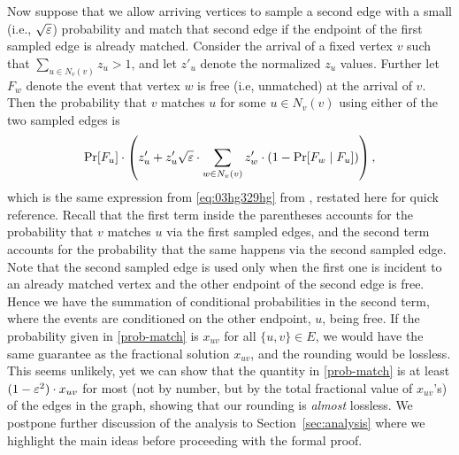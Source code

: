 Now suppose that we allow arriving vertices to sample a second edge with a small 
(i.e., $\sqrt{\varepsilon}$) probability and match that second edge if the endpoint of the first sampled 
edge is already matched.
Consider the arrival of a fixed vertex $v$ such that $\sum_{u \in N_v(v)}z_u > 1$, and let 
$z'_u$ denote the normalized $z_u$ values. Further let $F_w$ denote the event that vertex $w$ is free (i.e, unmatched) at the arrival of $v$. 
Then the probability that $v$ matches $u$ for some $u \in N_v(v)$ using either of the two sampled
edges is
\begin{align}
    \Pr[F_u] \cdot \left(z'_{u} + z'_u \sqrt{\varepsilon} \cdot 
    \sum_{w\in N_v(v)} z'_w \cdot (1-\Pr[F_w \mid F_u]) \right), \label{prob-match}
\end{align}
which is the same expression from \eqref{eq:03hg329hg} from , restated here for quick reference. 
Recall that the first term inside the parentheses accounts for the probability that $v$ matches 
$u$ via the first sampled edges, and the second term accounts for the probability that the same 
happens via the second sampled edge. 
Note that the second sampled edge is used only when the first one
is incident to an already matched vertex and the other endpoint of the second edge is free. 
Hence we have the summation of conditional probabilities in the second term, 
where the events are conditioned on the other endpoint, $u$, being free.
If the probability given in \eqref{prob-match} is $x_{uv}$ for all $\{u,v\} \in E$, we would have 
the same guarantee as the fractional solution  $x_{uv}$, and the rounding would be lossless. 
This seems unlikely, yet we can show that the quantity in \eqref{prob-match} is at least  
$(1 - \varepsilon^2) \cdot x_{uv}$ for most (not by number, but by the total fractional value of $x_{uv}$'s) of 
the edges in the graph, showing that our rounding is \emph{almost} lossless. 
We postpone further discussion of the analysis to Section~\ref{sec:analysis} where we highlight the main ideas 
before proceeding with the formal proof. 



